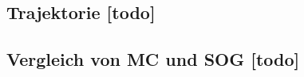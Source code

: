 \begin{comment}
--------------------------------------------------------------------------------
\end{comment}
\subsection{Trajektorie [todo]}


\begin{comment}
--------------------------------------------------------------------------------
\end{comment}
\subsection{Vergleich von MC und SOG [todo]}

